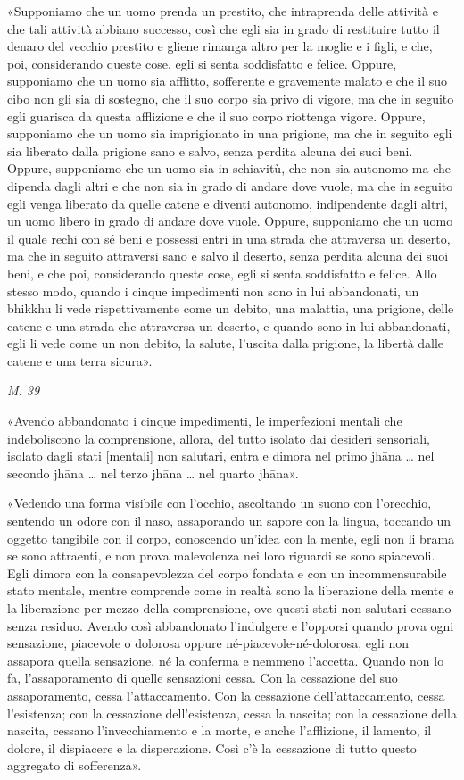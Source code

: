 «Supponiamo che un uomo prenda un prestito, che intraprenda delle
attività e che tali attività abbiano successo, così che egli sia in
grado di restituire tutto il denaro del vecchio prestito e gliene
rimanga altro per la moglie e i figli, e che, poi, considerando queste
cose, egli si senta soddisfatto e felice. Oppure, supponiamo che un uomo
sia afflitto, sofferente e gravemente malato e che il suo cibo non gli
sia di sostegno, che il suo corpo sia privo di vigore, ma che in seguito
egli guarisca da questa afflizione e che il suo corpo riottenga vigore.
Oppure, supponiamo che un uomo sia imprigionato in una prigione, ma che
in seguito egli sia liberato dalla prigione sano e salvo, senza perdita
alcuna dei suoi beni. Oppure, supponiamo che un uomo sia in schiavitù,
che non sia autonomo ma che dipenda dagli altri e che non sia in grado
di andare dove vuole, ma che in seguito egli venga liberato da quelle
catene e diventi autonomo, indipendente dagli altri, un uomo libero in
grado di andare dove vuole. Oppure, supponiamo che un uomo il quale
rechi con sé beni e possessi entri in una strada che attraversa un
deserto, ma che in seguito attraversi sano e salvo il deserto, senza
perdita alcuna dei suoi beni, e che poi, considerando queste cose, egli
si senta soddisfatto e felice. Allo stesso modo, quando i cinque
impedimenti non sono in lui abbandonati, un bhikkhu li vede
rispettivamente come un debito, una malattia, una prigione, delle catene
e una strada che attraversa un deserto, e quando sono in lui
abbandonati, egli li vede come un non debito, la salute, l’uscita dalla
prigione, la libertà dalle catene e una terra sicura».


\emph{M. 39}


«Avendo abbandonato i cinque impedimenti, le imperfezioni mentali che
indeboliscono la comprensione, allora, del tutto isolato dai desideri
sensoriali, isolato dagli stati [mentali] non salutari, entra e dimora
nel primo jhāna … nel secondo jhāna … nel terzo jhāna … nel quarto
jhāna».


«Vedendo una forma visibile con l’occhio, ascoltando un suono con
l’orecchio, sentendo un odore con il naso, assaporando un sapore con la
lingua, toccando un oggetto tangibile con il corpo, conoscendo un’idea
con la mente, egli non li brama se sono attraenti, e non prova
malevolenza nei loro riguardi se sono spiacevoli. Egli dimora con la
consapevolezza del corpo fondata e con un incommensurabile stato
mentale, mentre comprende come in realtà sono la liberazione della mente
e la liberazione per mezzo della comprensione, ove questi stati non
salutari cessano senza residuo. Avendo così abbandonato l’indulgere e
l’opporsi quando prova ogni sensazione, piacevole o dolorosa oppure
né-piacevole-né-dolorosa, egli non assapora quella sensazione, né la
conferma e nemmeno l’accetta. Quando non lo fa, l’assaporamento di
quelle sensazioni cessa. Con la cessazione del suo assaporamento, cessa
l’attaccamento. Con la cessazione dell’attaccamento, cessa l’esistenza;
con la cessazione dell’esistenza, cessa la nascita; con la cessazione
della nascita, cessano l’invecchiamento e la morte, e anche
l’afflizione, il lamento, il dolore, il dispiacere e la disperazione.
Così c’è la cessazione di tutto questo aggregato di sofferenza».


